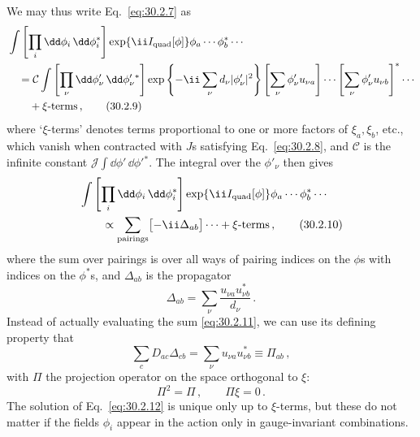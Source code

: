 We may thus write Eq.~\eqref{eq:30.2.7} as
\begin{align}
  &\int\left[\prod_i \dd\phi_i\,\dd\phi_i^*\right]
    \exp\{\ii I_{\mathrm{quad}}[\phi]\}
    \phi_a\cdots\phi_b^*\cdots
  \notag\\
  &\quad={}
    \mathcal{C}\int
    \left[\prod_\nu \dd\phi'_\nu\,\dd\phi_\nu'{}^*\right]
    \exp\left\{-\ii\sum_\nu d_\nu|\phi'_\nu|^2\right\}
    \left[\sum_\nu\phi'_\nu u_{\nu a}\right]\cdots
    \left[\sum_\nu\phi'_\nu u_{\nu b}\right]^*
    \cdots
  \notag\\
  &\qquad+\xi\text{-terms}\,,
  \tag{30.2.9}\label{eq:30.2.9}
\end{align}
where `\(\xi\)-terms' denotes terms proportional to one or more factors of
\(\xi_a,\xi_b\), etc., which vanish when contracted with \(J\)s satisfying
Eq.~\eqref{eq:30.2.8}, and \(\mathcal{C}\) is the infinite constant
\(\mathcal{J}\int \dd\phi'\,\dd\phi'{}^*\). The integral over the \(\phi'_\nu\) then gives
\begin{align}
  &\int\left[\prod_i \dd\phi_i\,\dd\phi_i^*\right]
    \exp\{\ii I_{\mathrm{quad}}[\phi]\}
    \phi_a\cdots\phi_b^*\cdots
  \notag\\
  &\qquad\propto
    \sum_{\text{pairings}}\bigl[-\ii\Delta_{ab}\bigr]\cdots
    +\xi\text{-terms}\,,
  \tag{30.2.10}\label{eq:30.2.10}
\end{align}
where the sum over pairings is over all ways of pairing indices on the
\(\phi\)s with indices on the \(\phi^*\)s, and \(\Delta_{ab}\) is the
propagator
\begin{equation}
  \Delta_{ab}=\sum_\nu\frac{u_{\nu a}u_{\nu b}^*}{d_\nu}\,.
  \tag{30.2.11}\label{eq:30.2.11}
\end{equation}
Instead of actually evaluating the sum \eqref{eq:30.2.11}, we can use its
defining property that
\begin{equation}
  \sum_cD_{ac}\Delta_{cb}
  =\sum_\nu u_{\nu a}u_{\nu b}^*
  \equiv\Pi_{ab}\,,
  \tag{30.2.12}\label{eq:30.2.12}
\end{equation}
with \(\Pi\) the projection operator on the space orthogonal to \(\xi\):
\begin{equation}
  \Pi^2=\Pi\,,
  \qquad
  \Pi\xi=0\,.
  \tag{30.2.13}\label{eq:30.2.13}
\end{equation}
The solution of Eq.~\eqref{eq:30.2.12} is unique only up to \(\xi\)-terms,
but these do not matter if the fields \(\phi_i\) appear in the action only in
gauge-invariant combinations.

